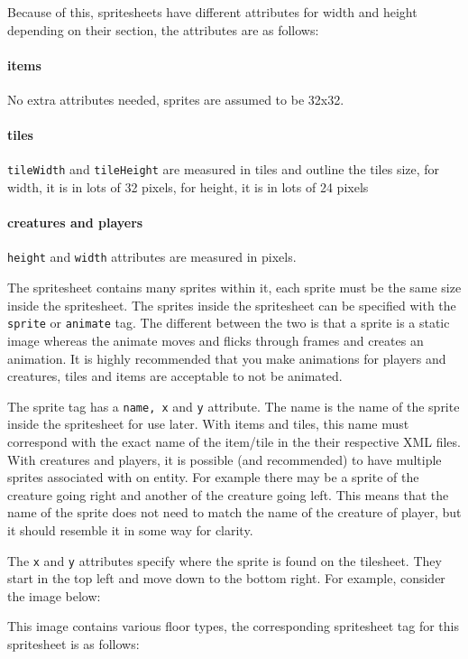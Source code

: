 \documentclass{book}
\begin{document}
Because of this, spritesheets have different attributes for width and height depending on their section, the attributes are as follows:

\paragraph{items} No extra attributes needed, sprites are assumed to be 32x32.
\paragraph{tiles} \texttt{tileWidth} and \texttt{tileHeight} are measured in tiles and outline the tiles size, for width, it is in lots of 32 pixels, for height, it is in lots of 24 pixels
\paragraph{creatures and players} \texttt{height} and \texttt{width} attributes are measured in pixels.

The spritesheet contains many sprites within it, each sprite must be the same size inside the spritesheet. The sprites inside the spritesheet can be specified with the \texttt{sprite} or \texttt{animate} tag. The different between the two is that a sprite is a static image whereas the animate moves and flicks through frames and creates an animation. It is highly recommended that you make animations for players and creatures, tiles and items are acceptable to not be animated.

The sprite tag has a \texttt{name, x} and \texttt{y} attribute. The name is the name of the sprite inside the spritesheet for use later. With items and tiles, this name must correspond with the exact name of the item/tile in the their respective XML files. With creatures and players, it is possible (and recommended) to have multiple sprites associated with on entity. For example there may be a sprite of the creature going right and another of the creature going left. This means that the name of the sprite does not need to match the name of the creature of player, but it should resemble it in some way for clarity.

The \texttt{x} and \texttt{y} attributes specify where the sprite is found on the tilesheet. They start in the top left and move down to the bottom right. For example, consider the image below:


This image contains various floor types, the corresponding spritesheet tag for this spritesheet is as follows:
\end{document}

